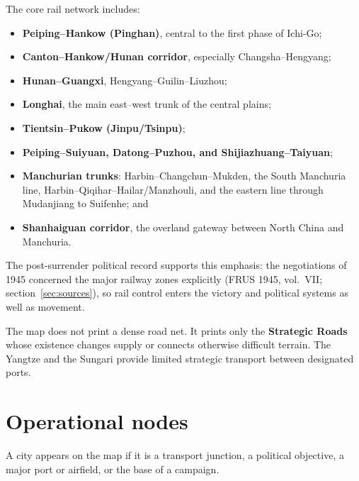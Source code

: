 \documentclass[11pt]{article}
\begin{document}
The core rail network includes:
\begin{itemize}
\item \textbf{Peiping--Hankow (Pinghan)}, central to the first phase of Ichi-Go;
\item \textbf{Canton--Hankow/Hunan corridor}, especially Changsha--Hengyang;
\item \textbf{Hunan--Guangxi}, Hengyang--Guilin--Liuzhou;
\item \textbf{Longhai}, the main east--west trunk of the central plains;
\item \textbf{Tientsin--Pukow (Jinpu/Tsinpu)};
\item \textbf{Peiping--Suiyuan, Datong--Puzhou, and Shijiazhuang--Taiyuan};
\item \textbf{Manchurian trunks}: Harbin--Changchun--Mukden, the South Manchuria line, Harbin--Qiqihar--Hailar/Manzhouli, and the eastern line through Mudanjiang to Suifenhe; and
\item \textbf{Shanhaiguan corridor}, the overland gateway between North China and Manchuria.
\end{itemize}

The post-surrender political record supports this emphasis: the negotiations of 1945 concerned the major railway zones explicitly (FRUS 1945, vol.~VII; section~\ref{sec:sources}), so rail control enters the victory and political systems as well as movement.

The map does not print a dense road net. It prints only the \textbf{Strategic Roads} whose existence changes supply or connects otherwise difficult terrain. The Yangtze and the Sungari provide limited strategic transport between designated ports.

\section{Operational nodes}
A city appears on the map if it is a transport junction, a political objective, a major port or airfield, or the base of a campaign.
\end{document}
